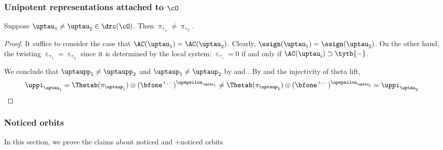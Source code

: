 \documentclass[ssunip]{subfiles}
\begin{document}




\subsubsection{Unipotent representations attached to $\cO$}

\begin{lem}\label{c:gd.D1}
  Suppose $\uptau_{1}\neq \uptau_{2}\in \drc(\cO)$. Then $\uppi_{\uptau_{1}}\neq \uppi_{\uptau_{2}}$.
\end{lem}
\begin{proof}
 It suffice to consider the case that $\oAC{\uptau_{1}}=\oAC{\uptau_{2}}$.
 Clearly, $\ssign(\uptau_{1})=\ssign(\uptau_{2})$. On the other hand,
 the twisting $\upepsilon_{\uptau_{1}}=\upepsilon_{\uptau_{2}}$ since it is
 determined by the  local system:
 $\upepsilon_{\uptau_{i}}=0$ if and only if $\oAC{\uptau_{i}}\supset \tytb{-}$.

 We conclude that $\uptaupp_{1}\neq \uptaupp_{2}$ and $\uptaup_{1}\neq \uptaup_{2}$
 by  and .
 By  and the injectivity of theta lift,
 \[
   \uppi_{\uptau_{1}} = \Thetab(\pi_{\uptaup_{1}})\otimes (\bfone^{+,-})^{\upepsilon_{\uptau_{1}}}
  \neq \Thetab(\pi_{\uptaup_{2}})\otimes (\bfone^{+,-})^{\upepsilon_{\uptau_{2}}} = \uppi_{\uptau_{2}}
 \]
\end{proof}


\subsubsection{Noticed orbits}



In this section, we prove the claims about noticed and +noticed orbits.
\end{document}
